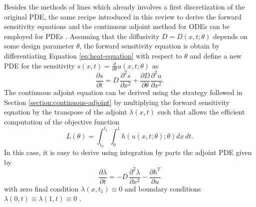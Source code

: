 Besides the methods of lines which already involves a first discretization of the original PDE, the same recipe introduced in this review to derive the forward sensitivity equations and the continuous adjoint method for ODEs can be employed for PDEs \cite{Giles_Pierce_2000}. 
Assuming that the diffusivity $D = D(x, t; \theta)$ depends on some design parameter $\theta$, the forward sensitivity equation is obtain by differentiating Equation \eqref{eq:heat-equation} with respect to $\theta$ and define a new PDE for the sensitivity $s(x,t) = \frac{d}{d\theta}u(x,t;\theta)$ as 
\begin{equation}
 \frac{\partial s}{\partial t}
 = 
 D \, 
 \frac{\partial^2 s}{\partial x^2}
 + 
 \frac{\partial D}{\partial \theta} \frac{\partial^2 u}{\partial x^2}. 
\end{equation}
The continuous adjoint equation can be derived using the strategy followed in Section \ref{section:continuous-adjoint} by multiplying the forward sensitivity equation by the transpose of the adjoint $\lambda (x,t)$ such that allows the efficient computation of the objective function
\begin{equation}
    L(\theta) = \int_{t_0}^{t_1} \int_0^1 h(u(x,t;\theta); \theta) dx \, dt. 
\end{equation}
In this case, it is easy to derive using integration by parts the adjoint PDE given by 
\begin{equation}
    \frac{\partial \lambda}{\partial t}
    = 
    - 
    D \, \frac{\partial^2 \lambda}{\partial x^2}
    - 
    \frac{\partial h^T}{\partial u}
\end{equation}
with zero final condition $\lambda(x, t_1) \equiv 0$ and boundary conditions $\lambda(0, t) \equiv \lambda(1, t) \equiv 0$ \cite{duchateau1996introduction}.

